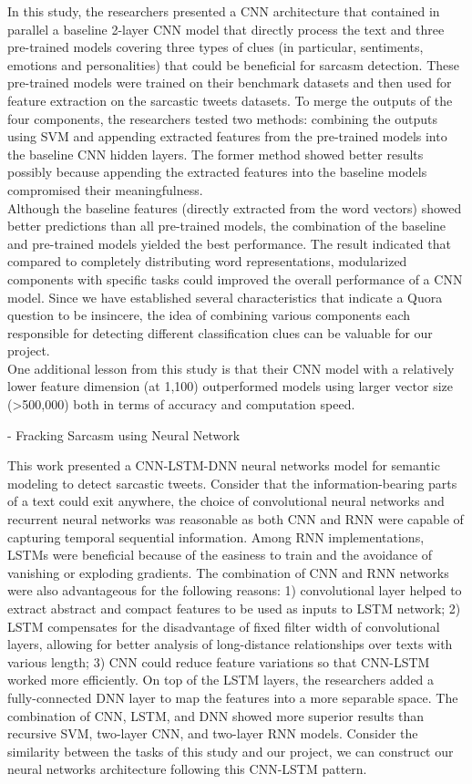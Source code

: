 \documentclass[12pt]{diazessay} %
\begin{document}
In this study, the researchers presented a CNN architecture that contained in parallel a baseline 2-layer CNN model that directly process the text and three pre-trained models covering three types of clues (in particular, sentiments, emotions and personalities) that could be beneficial for sarcasm detection. These pre-trained models were trained on their benchmark datasets and then used for feature extraction on the sarcastic tweets datasets. To merge the outputs of the four components, the researchers tested two methods: combining the outputs using SVM and appending extracted features from the pre-trained models into the baseline CNN hidden layers. The former method showed better results possibly because appending the extracted features into the baseline models compromised their meaningfulness. \\Although the baseline features (directly extracted from the word vectors) showed better predictions than all pre-trained models, the combination of the baseline and pre-trained models yielded the best performance. The result indicated that compared to completely distributing word representations, modularized components with specific tasks could improved the overall performance of a CNN model. Since we have established several characteristics that indicate a Quora question to be insincere, the idea of combining various components each responsible for detecting different classification clues can be valuable for our project. \\ One additional lesson from this study is that their CNN model with a relatively lower feature dimension (at 1,100) outperformed models using larger vector size (>500,000) both in terms of accuracy and computation speed. 

- Fracking Sarcasm using Neural Network \citep{ghosh2016}

This work presented a CNN-LSTM-DNN neural networks model for semantic modeling to detect sarcastic tweets. Consider that the information-bearing parts of a text could exit anywhere, the choice of convolutional neural networks and recurrent neural networks was reasonable as both CNN and RNN were capable of capturing temporal sequential information. Among RNN implementations, LSTMs were beneficial because of the easiness to train and the avoidance of vanishing or exploding gradients. The combination of CNN and RNN networks were also advantageous for the following reasons: 1) convolutional layer helped to extract abstract and compact features to be used as inputs to LSTM network; 2) LSTM compensates for the disadvantage of fixed filter width of convolutional layers, allowing for better analysis of long-distance relationships over texts with various length; 3) CNN could reduce feature variations so that CNN-LSTM worked more efficiently. On top of the LSTM layers, the researchers added a fully-connected DNN layer to map the features into a more separable space. The combination of CNN, LSTM, and DNN showed more superior results than recursive SVM, two-layer CNN, and two-layer RNN models. Consider the similarity between the tasks of this study and our project, we can construct our neural networks architecture following this CNN-LSTM pattern. 
\end{document}
